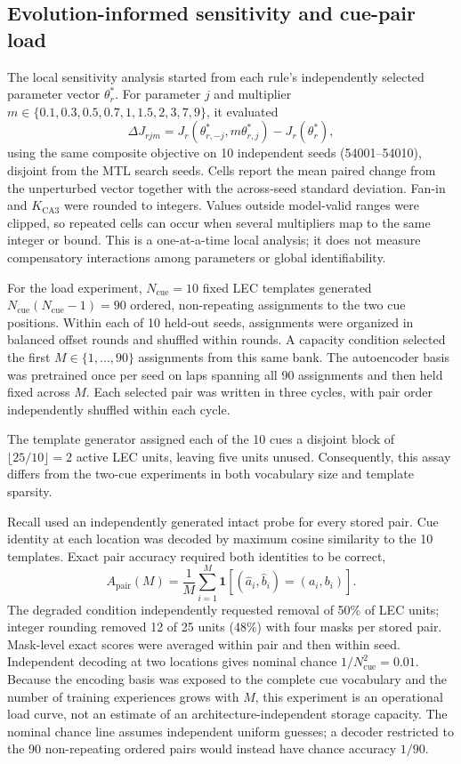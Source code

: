\subsection{Evolution-informed sensitivity and cue-pair load}

The local sensitivity analysis started from each rule's independently selected
parameter vector $\theta_r^*$. For parameter $j$ and multiplier
$m\in\{0.1,0.3,0.5,0.7,1,1.5,2,3,7,9\}$, it evaluated
\begin{equation}
\Delta J_{rjm}=
J_r(\theta_{r,-j}^*,m\theta_{r,j}^*)-J_r(\theta_r^*),
\label{eq:local-sensitivity}
\end{equation}
using the same composite objective on 10 independent seeds (54001--54010),
disjoint from the MTL search seeds. Cells report the mean paired change from
the unperturbed vector together with the across-seed standard deviation.
Fan-in and $K_{\mathrm{CA3}}$ were rounded to integers. Values outside
model-valid ranges were clipped, so repeated cells can occur when several
multipliers map to the same integer or bound. This is a one-at-a-time local
analysis; it does not measure compensatory interactions among parameters or
global identifiability.

For the load experiment, $N_{\mathrm{cue}}=10$ fixed LEC templates generated
$N_{\mathrm{cue}}(N_{\mathrm{cue}}-1)=90$ ordered, non-repeating assignments
to the two cue positions. Within each of 10 held-out seeds, assignments were
organized in balanced offset rounds and shuffled within rounds. A capacity
condition selected the first $M\in\{1,\ldots,90\}$ assignments from this same
bank. The autoencoder basis was pretrained once per seed on laps spanning all
90 assignments and then held fixed across $M$. Each selected pair was written
in three cycles, with pair order independently shuffled within each cycle.

The template generator assigned each of the 10 cues a disjoint block of
$\lfloor25/10\rfloor=2$ active LEC units, leaving five units unused.
Consequently, this assay differs from the two-cue experiments in both
vocabulary size and template sparsity.

Recall used an independently generated intact probe for every stored pair. Cue
identity at each location was decoded by maximum cosine similarity to the 10
templates. Exact pair accuracy required both identities to be correct,
\begin{equation}
A_{\mathrm{pair}}(M)=\frac{1}{M}
\sum_{i=1}^{M}\mathbf{1}
\!\left[(\widehat a_i,\widehat b_i)=(a_i,b_i)\right].
\label{eq:pair-capacity}
\end{equation}
The degraded condition independently requested removal of 50\% of LEC units;
integer rounding removed 12 of 25 units (48\%) with four masks per stored pair.
Mask-level exact scores were averaged within pair and then
within seed. Independent decoding at two locations gives nominal chance
$1/N_{\mathrm{cue}}^2=0.01$. Because the encoding basis was exposed to the
complete cue vocabulary and the number of training experiences grows with
$M$, this experiment is an operational load curve, not an estimate of an
architecture-independent storage capacity. The nominal chance line assumes
independent uniform guesses; a decoder restricted to the 90 non-repeating
ordered pairs would instead have chance accuracy $1/90$.
